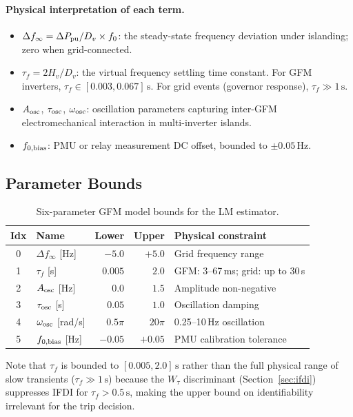 \documentclass[11pt, a4paper]{article}
\newcommand{\Wtau}{W_\tau}
\begin{document}
\paragraph{Physical interpretation of each term.}
\begin{itemize}
  \item $\Delta f_\infty = \Delta P_{\rm pu}/D_v \times f_0$\;[Hz]: the
    steady-state frequency deviation under islanding; zero when grid-connected.
  \item $\tau_f = 2H_v/D_v$\;[s]: the virtual frequency settling time
    constant.  For GFM inverters, $\tau_f \in [0.003, 0.067]\,\text{s}$.
    For grid events (governor response), $\tau_f \gg 1\,\text{s}$.
  \item $A_{\rm osc}$, $\tau_{\rm osc}$, $\omega_{\rm osc}$: oscillation
    parameters capturing inter-GFM electromechanical interaction in
    multi-inverter islands.
  \item $f_{0,\rm bias}$: PMU or relay measurement DC offset, bounded to
    $\pm 0.05\,\text{Hz}$.
\end{itemize}

\subsection{Parameter Bounds}

\begin{table}[h]
\centering
\caption{Six-parameter GFM model bounds for the LM estimator.}
\label{tab:bounds}
\begin{tabular}{clrrl}
\toprule
Idx & Name & Lower & Upper & Physical constraint \\
\midrule
0 & $\Delta f_\infty$ [Hz]   & $-5.0$  & $+5.0$   & Grid frequency range \\
1 & $\tau_f$ [s]             & $0.005$ & $2.0$    & GFM: 3--67\,ms; grid: up to 30\,s \\
2 & $A_{\rm osc}$ [Hz]       & $0.0$   & $1.5$    & Amplitude non-negative \\
3 & $\tau_{\rm osc}$ [s]     & $0.05$  & $1.0$    & Oscillation damping \\
4 & $\omega_{\rm osc}$ [rad/s]& $0.5\pi$& $20\pi$ & 0.25--10\,Hz oscillation \\
5 & $f_{0,\rm bias}$ [Hz]    & $-0.05$ & $+0.05$  & PMU calibration tolerance \\
\bottomrule
\end{tabular}
\end{table}

Note that $\tau_f$ is bounded to $[0.005, 2.0]\,\text{s}$ rather than the
full physical range of slow transients ($\tau_f \gg 1\,\text{s}$) because
the $\Wtau$ discriminant (Section~\ref{sec:ifdi}) suppresses IFDI for
$\tau_f > 0.5\,\text{s}$, making the upper bound on identifiability
irrelevant for the trip decision.
\end{document}
